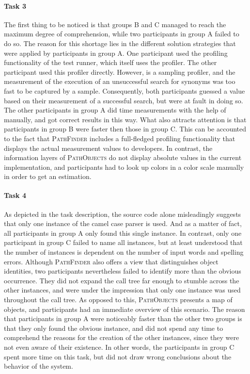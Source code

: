 \paragraph{Task 3} The first thing to be noticed is that groups B and C managed to reach the maximum degree of comprehension, while two participants in group A failed to do so.
The reason for this shortage lies in the different solution strategies that were applied by participants in group A.
One participant used the profiling functionality of the test runner, which itself uses the  profiler.
The other participant used this profiler directly.
However,  is a sampling profiler, and the measurement of the execution of an unsuccessful search for synonyms was too fast to be captured by a sample.
Consequently, both participants guessed a value based on their measurement of a successful search, but were at fault in doing so.
The other participants in group A did time measurements with the help of  manually, and got correct results in this way.
What also attracts attention is that participants in group B were faster then those in group C.
This can be accounted to the fact that \textsc{PathFinder} includes a full-fledged profiling functionality that displays the actual measurement values to developers.
In contrast, the information layers of \textsc{PathObjects} do not display absolute values in the current implementation, and participants had to look up colors in a color scale manually in order to get an estimation.

\paragraph{Task 4} As depicted in the task description, the source code alone misleadingly suggests that only one instance of the camel case parser is used.
And as a matter of fact, all participants in group A only found this single instance.
In contrast, only one participant in group C failed to name all instances, but at least understood that the number of instances is dependent on the number of input words and spelling errors.
Although \textsc{PathFinder} also offers a view that distinguishes object identities, two participants nevertheless failed to identify more than the obvious occurrence.
They did not expand the call tree far enough to stumble across the other instances, and were under the impression that only one instance was used throughout the call tree.
As opposed to this, \textsc{PathObjects} presents a map of objects, and participants had an immediate overview of this scenario.
The reason that participants in group A were noticeably faster than the other two groups is that they only found the obvious instance, and did not spend any time to comprehend the reasons for the creation of the other instances, since they were not even aware of their existence.
In other words, the participants in group C spent more time on this task, but did not draw wrong conclusions about the behavior of the system.

